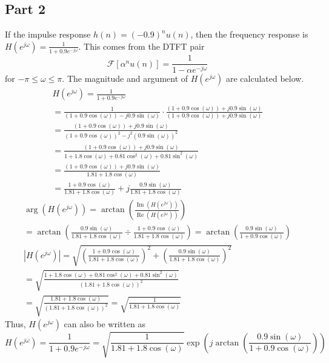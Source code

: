 \documentclass{article}
\begin{document}
\subsection*{Part 2}
If the impulse response \(h(n) = (-0.9)^n u(n)\), then the
frequency response is \(H\left( e^{j\omega} \right)
= \frac{1}{1 + 0.9e^{-j\omega}}\). This comes from the DTFT pair
\begin{equation*}
    \mathcal{F}[\alpha^n u(n)] = \frac{1}{1-\alpha e^{-j\omega}}
\end{equation*} for \(-\pi \le \omega \le \pi\).
The magnitude and argument of \(H\left(e^{j\omega}\right)\) are
calculated below.
\begin{gather*}
    H\left( e^{j\omega} \right) = \frac{1}{1 + 0.9e^{-j\omega}} \\
    = \frac{1}{(1 + 0.9\cos(\omega)) - j0.9\sin(\omega)} \cdot \frac{(1 + 0.9\cos(\omega)) + j0.9\sin(\omega)}{(1 + 0.9\cos(\omega)) + j0.9\sin(\omega)}\\
    = \frac{(1 + 0.9\cos(\omega)) + j0.9\sin(\omega)}{(1 + 0.9\cos(\omega))^2 - j^2 (0.9 \sin(\omega))^2}\\
    = \frac{(1 + 0.9\cos(\omega)) + j0.9\sin(\omega)}{1 + 1.8\cos(\omega) + 0.81\cos^2(\omega) + 0.81\sin^2(\omega)}\\
    = \frac{(1 + 0.9\cos(\omega)) + j0.9\sin(\omega)}{1.81 + 1.8\cos(\omega)}\\
    = \frac{1 + 0.9\cos(\omega)}{1.81 + 1.8\cos(\omega)} + j\frac{0.9\sin(\omega)}{1.81 + 1.8\cos(\omega)}
\end{gather*}
\begin{gather*}
    \operatorname{arg} \left(H\left(e^{j\omega}\right)\right) = \arctan\left( \frac{\operatorname{Im}\left(H\left(e^{j\omega}\right)\right)}{\operatorname{Re}\left(H\left(e^{j\omega}\right)\right)} \right)\\
    = \arctan \left( \frac{0.9\sin(\omega)}{1.81 + 1.8\cos(\omega)} \div \frac{1 + 0.9\cos(\omega)}{1.81 + 1.8\cos(\omega)} \right) = \arctan \left(\frac{0.9\sin(\omega)}{1 + 0.9\cos(\omega)}\right)\\
    \left| H\left(e^{j\omega}\right) \right| = \sqrt{ \left(\frac{1 + 0.9\cos(\omega)}{1.81 + 1.8\cos(\omega)}\right)^2 + \left(\frac{0.9\sin(\omega)}{1.81 + 1.8\cos(\omega)}\right)^2 }\\
    = \sqrt{ \frac{1 + 1.8\cos(\omega) + 0.81\cos^2(\omega) + 0.81\sin^2(\omega)}{(1.81 + 1.8\cos(\omega))^2}}\\
    = \sqrt{ \frac{1.81 + 1.8\cos(\omega)}{(1.81 + 1.8\cos(\omega))^2} } = \sqrt{\frac{1}{1.81 + 1.8\cos(\omega)}}
\end{gather*}
Thus, \( H\left(e^{j\omega}\right) \) can also be written as
\begin{equation*}
    H\left(e^{j\omega}\right) = \frac{1}{1 + 0.9e^{-j\omega}}
    =\sqrt{\frac{1}{1.81 + 1.8\cos(\omega)}}\exp \left(j\arctan \left(\frac{0.9\sin(\omega)}{1 + 0.9\cos(\omega)}\right)\right)
\end{equation*}
\end{document}
